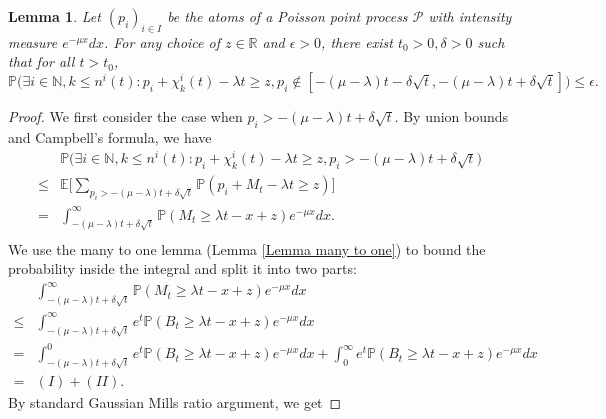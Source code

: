 \documentclass[10pt,a4paper]{amsart}
\newtheorem{lemma}{Lemma}
\begin{document}
\begin{lemma}\label{Main_contribution in sec3}
  Let $(p_{i})_{i\in I}$ be the atoms of a Poisson point process $\mathcal P$ with intensity measure $e^{-\mu x}dx$. For any choice of $z\in \mathbb R$ and $\epsilon>0$, there exist $t_{0}>0, \delta >0$ such that for all $t > t_{0}$, 
  \begin{equation}
    \mathbb{P} \biggl(\exists i\in \mathbb N, k \le n^{i}(t):p_{i}+\chi_k^i(t)-\lambda t \ge z,p_i\notin[-(\mu - \lambda)t-\delta\sqrt{t},-(\mu -\lambda)t+\delta\sqrt{t}]\biggr)\le \epsilon. \label{2.18}
  \end{equation}
\end{lemma}

\begin{proof}
  We first consider the case when $p_{i}> -(\mu -\lambda)t+\delta\sqrt{t}$.
  By union bounds and Campbell's formula, we have 
  \begin{equation}\label{estimae in Lem3.2}
    \begin{aligned}
       &\mathbb{P} \biggl(\exists i\in \mathbb N, k \le n^{i}(t):p_{i}+\chi_k^i(t)-\lambda t \ge z, p_i>-(\mu -\lambda)t+\delta\sqrt{t} \biggr)\\
     \le&\mathbb{E} \biggl[\sum_{p_{i} > -(\mu - \lambda)t +\delta \sqrt{t}}\mathbb{P} (p_{i}+M_{t}-\lambda t \ge z)\biggr]\\
      =&\int_{-(\mu-\lambda)t+\delta\sqrt{t}}^{\infty}\mathbb{P} (M_{t}\ge \lambda t-x+z)e^{-\mu x}dx.\\
    \end{aligned}
  \end{equation}
We use the many to one lemma  (Lemma \ref{Lemma many to one}) to bound the probability inside the integral and split it into two parts:
\begin{equation}
    \begin{aligned}
    &\int_{-(\mu-\lambda)t+\delta\sqrt{t}}^{\infty}\mathbb{P} (M_{t}\ge \lambda t-x+z)e^{-\mu x}dx\\
           \le&\int_{-(\mu-\lambda)t+\delta\sqrt{t}}^{\infty}e^{t}\mathbb{P}(B_{t}\ge \lambda t-x+z)e^{-\mu x}dx \\
    = &\int_{-(\mu-\lambda)t+\delta\sqrt{t}}^{0}e^{t}\mathbb{P}(B_{t}\ge \lambda t-x+z)e^{-\mu x}dx + \int_{0}^{\infty}e^{t}\mathbb{P}(B_{t}\ge \lambda t-x+z)e^{-\mu x}dx\\
     = &(I) + (II). \label{2.19}
    \end{aligned}
\end{equation}
By standard Gaussian Mills ratio argument, we get

\end{proof}
\end{document}
